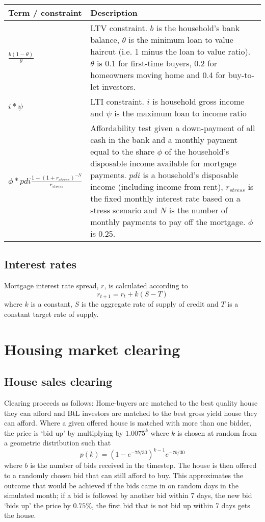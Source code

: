 \documentclass{article}
\begin{document}
\noindent \bigskip 
\begin{tabular}{p{1.5in}|p{4in}}
Term / constraint & Description \\ \hline\hline
$\frac{b(1-\theta )}{\theta }$ & LTV constraint. $b$ is the household's bank
balance, $\theta $ is the minimum loan to value haircut (i.e. 1 minus the
loan to value ratio). $\theta $ is 0.1 for first-time buyers, 0.2 for
homeowners moving home and 0.4 for buy-to-let investors. \\ 
$i\ast \psi $ & LTI constraint. $i$ is household gross income and $\psi $ is
the maximum loan to income ratio \\ 
$\phi \ast pdi\frac{1-(1+r_{stress})^{-N}}{r_{stress}}$ & Affordability test
given a down-payment of all cash in the bank and a monthly payment equal to
the share $\phi $ of the household's disposable income available for
mortgage payments. $pdi$ is a household's disposable income (including
income from rent), $r_{stress}$ is the fixed monthly interest rate based on
a stress scenario and $N$ is the number of monthly payments to pay off the
mortgage. $\phi $ is 0.25.%
\end{tabular}

\subsection{Interest rates}
Mortgage interest rate spread, $r$, is calculated according to
\[
r_{t+1} = r_{t} + k(S-T)
\]
where $k$ is a constant, $S$ is the aggregate rate of supply of credit and $T$ is a constant target rate of supply.

\section{Housing market clearing}

\subsection{House sales clearing}

Clearing proceeds as follows: Home-buyers are matched to the best quality
house they can afford and BtL investors are matched to the best gross yield house they can afford. Where a given offered house is matched with more than one bidder, the price is `bid up' by multiplying by $1.0075^k$ where $k$ is chosen at random from a geometric distribution such that
\[
p(k) = (1-e^{-7b/30})^{k-1}e^{-7b/30}
\]
where $b$ is the number of bids received in the timestep. The house is then offered to a randomly chosen bid that can still afford to buy. This approximates the outcome that would be achieved if the bids came in on random days in the simulated month; if a bid is followed by another bid within 7 days, the new bid `bids up' the price by $0.75\%$, the first bid that is not bid up within 7 days gets the house.
\end{document}
